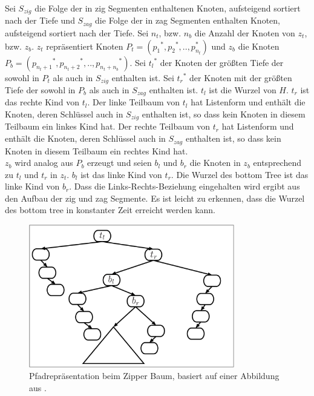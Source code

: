\documentclass[a4paper,12pt]{article}
\begin{document}
Sei $S_{zig}$ die Folge der in zig Segmenten enthaltenen Knoten, aufsteigend sortiert nach der Tiefe und $S_{zag}$ die Folge der in zag Segmenten enthalten Knoten, aufsteigend sortiert nach der Tiefe.  Sei $n_t$, bzw. $n_b$ die Anzahl der Knoten von $z_t$, bzw. $z_b$. $z_t$ repräsentiert Knoten  $P_t = \left({p_1}^*,{p_2}^*,..,p_{n_t}^*\right)$ und $z_b$ die Knoten  $P_b = \left({p_{n_t + 1}}^*,{p_{n_t + 2}}^*,..,{p_{n_t + n_b}}^*\right)$.
Sei ${t_l}^*$ der Knoten der größten Tiefe der sowohl in $P_t$ als auch in $S_{zig}$ enthalten ist. Sei ${t_r}^*$ der Knoten mit der größten Tiefe der sowohl in $P_b$ als auch in $S_{zag}$ enthalten ist. $t_l$ ist die Wurzel von $H$. $t_r$ ist das rechte Kind von $t_l$. Der linke Teilbaum von $t_l$  hat Listenform und  enthält die  Knoten, deren Schlüssel auch in  $S_{zig}$ enthalten ist, so dass kein Knoten in diesem Teilbaum ein linkes Kind hat. Der rechte Teilbaum von $t_r$  hat Listenform und  enthält die  Knoten, deren Schlüssel auch in $S_{zag}$ enthalten ist, so dass kein Knoten in diesem Teilbaum ein rechtes Kind hat. \\
$z_b$ wird analog aus $P_b$ erzeugt und seien $b_l$ und $b_r$ die Knoten in $z_b$ entsprechend zu $t_l$ und $t_r$ in $z_t$. $b_l$ ist das linke Kind von $t_r$. Die Wurzel des bottom Tree ist das linke Kind von $b_r$. Dass die Links-Rechts-Beziehung eingehalten wird ergibt aus den Aufbau der zig und zag Segmente. Es ist leicht zu erkennen, dass die Wurzel des bottom tree in konstanter Zeit erreicht werden kann.
\begin{figure}[H]
	\centering
	\includegraphics[width= 0.8\textwidth]{Medien/Zipper/zipperPathRep}
	\caption{Pfadrepräsentation beim Zipper Baum, basiert auf einer Abbildung aus \cite{zipper}. }
	\label{fig:zipperPathRep}
\end{figure}
\end{document}
